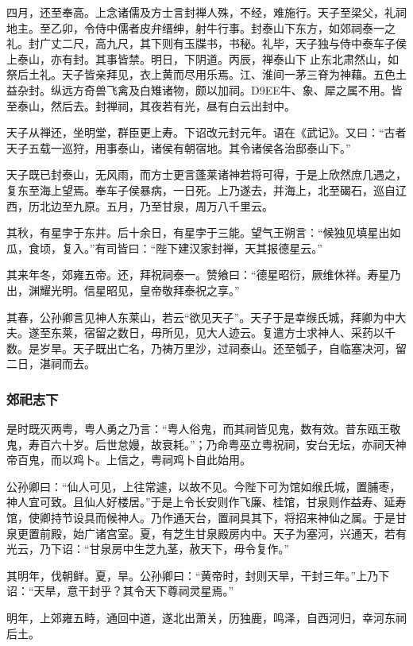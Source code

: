 \documentclass[]{article}
\begin{document}
四月，还至奉高。上念诸儒及方士言封禅人殊，不经，难施行。天子至梁父，礼祠地主。至乙卯，令侍中儒者皮弁缙绅，射牛行事。封泰山下东方，如郊祠泰一之礼。封广丈二尺，高九尺，其下则有玉牒书，书秘。礼毕，天子独与侍中泰车子侯上泰山，亦有封。其事皆禁。明日，下阴道。丙辰，禅泰山下止东北肃然山，如祭后土礼。天子皆亲拜见，衣上黄而尽用乐焉。江、淮间一茅三脊为神藉。五色土益杂封。纵远方奇兽飞禽及白雉诸物，颇以加祠。D9EE牛、象、犀之属不用。皆至泰山，然后去。封禅祠，其夜若有光，昼有白云出封中。

天子从禅还，坐明堂，群臣更上寿。下诏改元封元年。语在《武记》。又曰：``古者天子五载一巡狩，用事泰山，诸侯有朝宿地。其令诸侯各治邸泰山下。''

天子既已封泰山，无风雨，而方士更言蓬莱诸神若将可得，于是上欣然庶几遇之，复东至海上望焉。奉车子侯暴病，一日死。上乃遂去，并海上，北至碣石，巡自辽西，历北边至九原。五月，乃至甘泉，周万八千里云。

其秋，有星孛于东井。后十余日，有星孛于三能。望气王朔言：``候独见填星出如瓜，食顷，复入。''有司皆曰：``陛下建汉家封禅，天其报德星云。''

其来年冬，郊雍五帝。还，拜祝祠泰一。赞飨曰：``德星昭衍，厥维休祥。寿星乃出，渊耀光明。信星昭见，皇帝敬拜泰祝之享。''

其春，公孙卿言见神人东莱山，若云``欲见天子''。天子于是幸缑氏城，拜卿为中大夫。遂至东莱，宿留之数日，毋所见，见大人迹云。复遣方士求神人、采药以千数。是岁旱。天子既出亡名，乃祷万里沙，过祠泰山。还至瓠子，自临塞决河，留二日，湛祠而去。

\hypertarget{header-n1782}{%
\subsubsection{郊祀志下}\label{header-n1782}}

是时既灭两粤，粤人勇之乃言：``粤人俗鬼，而其祠皆见鬼，数有效。昔东瓯王敬鬼，寿百六十岁。后世怠嫚，故衰耗。''；乃命粤巫立粤祝祠，安台无坛，亦祠天神帝百鬼，而以鸡卜。上信之，粤祠鸡卜自此始用。

公孙卿曰：``仙人可见，上往常遽，以故不见。今陛下可为馆如缑氏城，置脯枣，神人宜可致。且仙人好楼居。''于是上令长安则作飞廉、桂馆，甘泉则作益寿、延寿馆，使卿持节设具而候神人。乃作通天台，置祠具其下，将招来神仙之属。于是甘泉更置前殿，始广诸宫室。夏，有芝生甘泉殿房内中。天子为塞河，兴通天，若有光云，乃下诏：``甘泉房中生芝九茎，赦天下，毋令复作。''

其明年，伐朝鲜。夏，旱。公孙卿曰：``黄帝时，封则天旱，干封三年。''上乃下诏：``天旱，意干封乎？其令天下尊祠灵星焉。''

明年，上郊雍五畤，通回中道，遂北出萧关，历独鹿，鸣泽，自西河归，幸河东祠后土。
\end{document}
